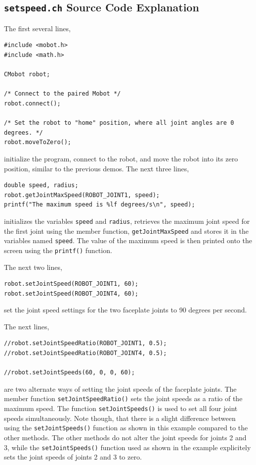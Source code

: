\documentclass{article}
\begin{document}
\subsection{\texttt{setspeed.ch} Source Code Explanation}
The first several lines,
\begin{verbatim}
#include <mobot.h>
#include <math.h>

CMobot robot;

/* Connect to the paired Mobot */
robot.connect();

/* Set the robot to "home" position, where all joint angles are 0 degrees. */
robot.moveToZero();
\end{verbatim}
initialize the program, connect to the robot, and move the robot into its zero position,
similar to the previous demos. The next three lines,
\begin{verbatim}
double speed, radius;
robot.getJointMaxSpeed(ROBOT_JOINT1, speed);
printf("The maximum speed is %lf degrees/s\n", speed);
\end{verbatim}
initializes the variables \texttt{speed} and \texttt{radius},
retrieves the maximum joint speed for the first joint using the member function,
\texttt{getJointMaxSpeed} and stores it in the variables named \texttt{speed}.
The value of the maximum speed is then printed onto the screen using the \texttt{printf()}
function.

The next two lines,
\begin{verbatim}
robot.setJointSpeed(ROBOT_JOINT1, 60);
robot.setJointSpeed(ROBOT_JOINT4, 60);
\end{verbatim}
set the joint speed settings for the two faceplate joints to 90 degrees per second.

The next lines, 
\begin{verbatim}
//robot.setJointSpeedRatio(ROBOT_JOINT1, 0.5);
//robot.setJointSpeedRatio(ROBOT_JOINT4, 0.5);

//robot.setJointSpeeds(60, 0, 0, 60);
\end{verbatim}
are two alternate ways of setting the joint speeds of the faceplate joints. 
The member function \texttt{setJointSpeedRatio()} sets the joint speeds as a ratio of the 
maximum speed. The function \texttt{setJointSpeeds()} is used to set all four
joint speeds simultaneously. Note though, that there is a slight difference between
using the \texttt{setJointSpeeds()} function as shown in this example compared to the
other methods. The other methods do not alter the joint speeds for joints 2 and 3, while
the \texttt{setJointSpeeds()} function used as shown in the example explicitely sets
the joint speeds of joints 2 and 3 to zero. 
\end{document}
